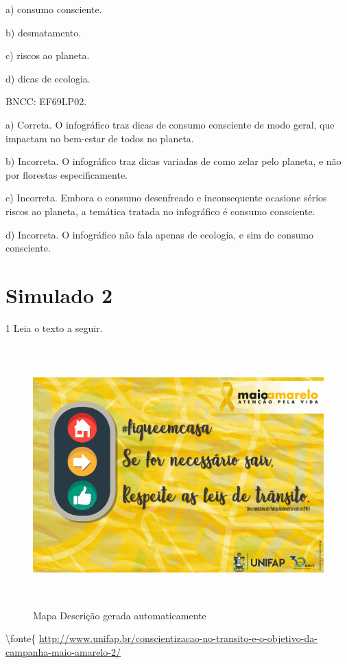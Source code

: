 a) consumo consciente.

b) desmatamento.

c) riscos ao planeta.

d) dicas de ecologia.

BNCC: EF69LP02.

a) Correta. O infográfico traz dicas de consumo consciente de modo
geral, que impactam no bem-estar de todos no planeta.

b) Incorreta. O infográfico traz dicas variadas de como zelar pelo
planeta, e não por florestas especificamente.

c) Incorreta. Embora o consumo desenfreado e inconsequente ocasione
sérios riscos ao planeta, a temática tratada no infográfico é consumo
consciente.

d) Incorreta. O infográfico não fala apenas de ecologia, e sim de
consumo consciente.

\hypertarget{simulado-2}{%
\section{Simulado 2}\label{simulado-2}}

\num{1} Leia o texto a seguir.

\begin{figure}
\centering
\includegraphics[width=5.90556in,height=3.95694in]{./imgSAEB_6_POR/media/image38.png}
\caption{Mapa Descrição gerada automaticamente}
\end{figure}

\textbackslash fonte\{
\url{http://www.unifap.br/conscientizacao-no-transito-e-o-objetivo-da-campanha-maio-amarelo-2/}

